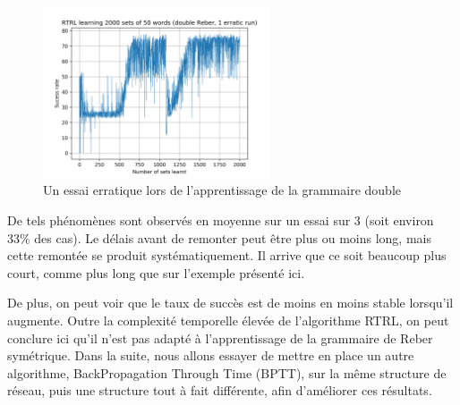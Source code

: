 \begin{figure}[!ht]
\begin{center}
\includegraphics[width=0.6\textwidth]{images/SimpleRTRL-re.png}
\end{center}
\caption{Un essai erratique lors de l'apprentissage de la grammaire double}
\end{figure}

De tels phénomènes sont observés en moyenne sur un essai sur 3 (soit environ 33\% des cas). Le délais avant de remonter peut être plus ou moins long, mais cette remontée se produit systématiquement. Il arrive que ce soit beaucoup plus court, comme plus long que sur l'exemple présenté ici.

De plus, on peut voir que le taux de succès est de moins en moins stable lorsqu'il augmente. Outre la complexité temporelle élevée de l'algorithme RTRL, on peut conclure ici qu'il n'est pas adapté à l'apprentissage de la grammaire de Reber symétrique. Dans la suite, nous allons essayer de mettre en place un autre algorithme, BackPropagation Through Time (BPTT), sur la même structure de réseau, puis une structure tout à fait différente, afin d'améliorer ces résultats.

